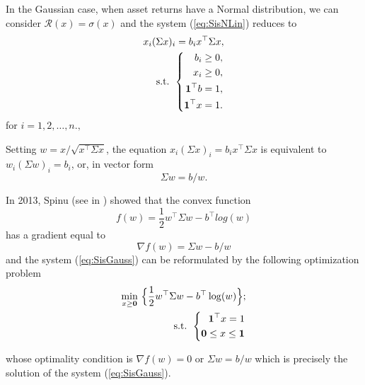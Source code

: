 In the Gaussian case, when asset returns have a Normal distribution, we can consider $\mathcal{R}(x)=\sigma(x)$ and the system (\ref{eq:SisNLin}) reduces to
\begin{eqnarray}\label{eq:SisGauss}
x_i (\Sigma x )_i = b_i x^\top \Sigma x,\\
	\mbox{s.t. }\left\{
	\begin{aligned}\nonumber
b_i \geq 0, \\
x_i \geq 0, \\
{\bf 1}^\top b =1, \\
{\bf 1}^\top x =1.
	\end{aligned}
	\right.
\end{eqnarray}
for $i=1,2,\dots,n., $


Setting $w=x/\sqrt{x^\top \Sigma x}$, the equation $x_i (\Sigma x )_i = b_i x^\top \Sigma x$ is equivalent to $w_i(\Sigma w)_i =b_i$, or, in vector form
\[
\Sigma w = b/w.
\]

In 2013, Spinu (see in \cite{Spinu2013}) showed that the convex function
\[
f(w)= \frac{1}{2}w^\top \Sigma w - b^\top log(w)
\]
has a gradient equal to
\[
\nabla f(w) = \Sigma w - b/w
\]
and the system (\ref{eq:SisGauss}) can be reformulated by the following optimization problem
\begin{eqnarray}\label{eq:GaussProb}
\min_{x\geq {\bf 0}}\,\Big\{\frac{1}{2}w^\top \Sigma w - b^\top \log(w)\Big\};  \\
	\mbox{s.t. }\left\{
	\begin{aligned}\nonumber
		\mathbf{1}^\top x=1 & \\
		\mathbf{0}\leq x \leq \mathbf{1}
	\end{aligned}
	\right.
\end{eqnarray}


whose optimality condition is $\nabla f(w) = 0$ or $\Sigma w = b/w$ which is precisely the solution of the system (\ref{eq:SisGauss}).



